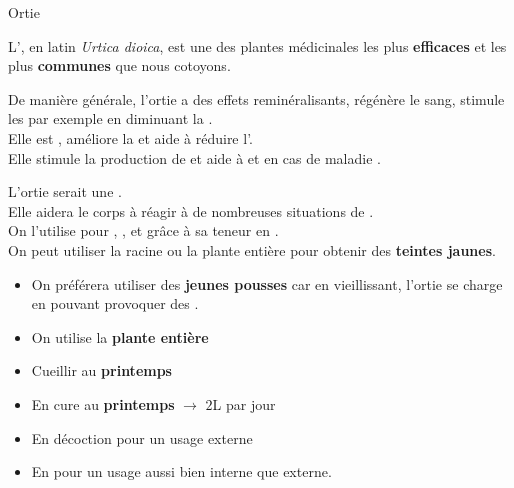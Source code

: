 \label{ortie}
\renewcommand{\cita}{
    \phantom{a}\citer{La vérité était que la vie nous avait jetés aux orties, l'un et l'autre\ldots\\ et c'est toujours ce qu'on appelle une rencontre.}{\href{https://fr.wikipedia.org/wiki/Romain_Gary}{Romain Gary}}

}
\ficheidentiteplante
{Ortie}
{%
    L', en latin \textit{Urtica dioica}, est une des plantes médicinales les plus \textbf{efficaces} et les plus \textbf{communes} que nous cotoyons.

    De manière générale, l'ortie a des effets reminéralisants, régénère le sang, stimule les  par exemple en diminuant la .\\ 
    Elle est , améliore la  et aide à réduire l'.\\

    Elle stimule la production de  et aide à  et en cas de maladie .
}
{%
    L'ortie serait une . \\ Elle aidera le corps à réagir à de nombreuses situations de .\\
    On l'utilise pour , ,  et  grâce à sa teneur en .\\
    On peut utiliser la racine ou la plante entière pour obtenir des \textbf{teintes jaunes}.
}
{%
    \begin{itemize}[label=\faPen]
        \item On préférera utiliser des \textbf{jeunes pousses} car en vieillissant, l'ortie se charge en  pouvant provoquer des .
        \item On utilise la \textbf{plante entière}
        \item Cueillir au \textbf{printemps}
    \end{itemize}
}
{%
    \begin{itemize}[label = \bcplume]
        \item En cure au \textbf{printemps} $\longrightarrow$ $2$L par jour
        \item En décoction pour un usage externe
        \item En  pour un usage aussi bien interne que externe.
    \end{itemize}
}
